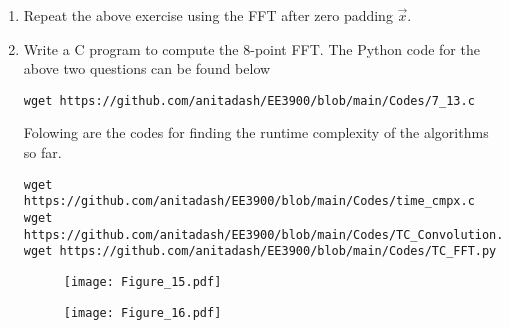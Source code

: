 \documentclass[journal,12pt,twocolumn]{IEEEtran}
\renewcommand\thesection{\arabic{section}}
\begin{document}
\begin{enumerate}[label=\thesection.\arabic*]
\begin{lstlisting}
\end{lstlisting}
    \item Repeat the above exercise using the FFT
	    after zero padding $\vec{x}$.
\item Write a C program to compute the 8-point FFT. 
\solution The Python code for the above two questions can be found below
\begin{lstlisting}
wget https://github.com/anitadash/EE3900/blob/main/Codes/7_13.c
\end{lstlisting}
Folowing are the codes for finding the runtime complexity of the algorithms so far.
\begin{lstlisting}
wget https://github.com/anitadash/EE3900/blob/main/Codes/time_cmpx.c
wget https://github.com/anitadash/EE3900/blob/main/Codes/TC_Convolution.py
wget https://github.com/anitadash/EE3900/blob/main/Codes/TC_FFT.py
\end{lstlisting}
\begin{figure}[!ht]
\begin{center}
\texttt{[image: Figure\_15.pdf]}
\end{center}
\label{fig:15}	
\end{figure}

\begin{figure}[!ht]
\begin{center}
\texttt{[image: Figure\_16.pdf]}
\end{center}
\label{fig:16}	
\end{figure}
\end{enumerate}
\end{document}
